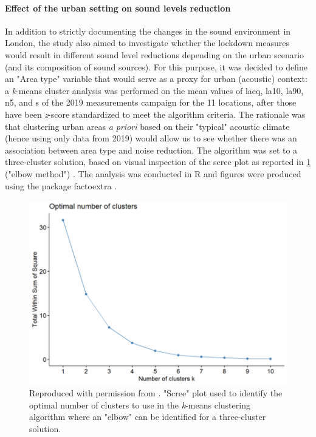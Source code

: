 \paragraph*{Effect of the urban setting on sound levels reduction}
In addition to strictly documenting the changes in the sound environment in London, the study also aimed to investigate whether the lockdown measures would result in different sound level reductions depending on the urban scenario (and its composition of sound sources). For this purpose, it was decided to define an "Area type" variable that would serve as a proxy for urban (acoustic) context: a \emph{k}-means cluster analysis was performed on the mean values of \gls{laeq}, \gls{la10}, \gls{la90}, \gls{n5}, and \gls{s} of the 2019 measurements campaign for the 11 locations, after those have been \emph{z}-score standardized to meet the algorithm criteria. The rationale was that clustering urban areas \emph{a priori} based on their "typical" acoustic climate (hence using only data from 2019) would allow us to see whether there was an association between area type and noise reduction. The algorithm was set to a three-cluster solution, based on visual inspection of the scree plot as reported in \cref{fig:NsMapLockScree} ("elbow method") . The analysis was conducted in R  and figures were produced using the package factoextra . 

\begin{figure}[h!]
  \centering
  \includegraphics[width=.75\textwidth]{Figures/NoiseMappingLockdown Fig 6.png}  
  \caption{Reproduced with permission from \citet{Aletta2020Assessing}. "Scree" plot used to identify the optimal number of clusters to use in the \emph{k}-means clustering algorithm where an "elbow" can be identified for a three-cluster solution. \label{fig:NsMapLockScree}}
\end{figure}

